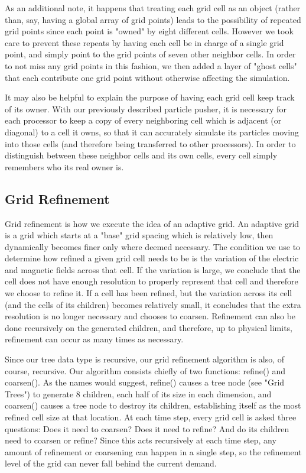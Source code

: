 \documentclass[]{article}
\begin{document}
As an additional note, it happens that treating each grid cell as an object (rather than, say, having a global array of grid points) leads to the possibility of repeated grid points since each point is "owned" by eight different cells. However we took care to prevent these repeats by having each cell be in charge of a single grid point, and simply point to the grid points of seven other neighbor cells. In order to not miss any grid points in this fashion, we then added a layer of "ghost cells" that each contribute one grid point without otherwise affecting the simulation.

It may also be helpful to explain the purpose of having each grid cell keep track of its owner. With our previously described particle pusher, it is necessary for each processor to keep a copy of every neighboring cell which is adjacent (or diagonal) to a cell it owns, so that it can accurately simulate its particles moving into those cells (and therefore being transferred to other processors). In order to distinguish between these neighbor cells and its own cells, every cell simply remembers who its real owner is.

\subsection{Grid Refinement}
Grid refinement is how we execute the idea of an adaptive grid. An adaptive grid is a grid which starts at a "base" grid spacing which is relatively low, then dynamically becomes finer only where deemed necessary. The condition we use to determine how refined a given grid cell needs to be is the variation of the electric and magnetic fields across that cell. If the variation is large, we conclude that the cell does not have enough resolution to properly represent that cell and therefore we choose to refine it. If a cell has been refined, but the variation across its cell (and the cells of its children) becomes relatively small, it concludes that the extra resolution is no longer necessary and chooses to coarsen. Refinement can also be done recursively on the generated children, and therefore, up to physical limits, refinement can occur as many times as necessary.

Since our tree data type is recursive, our grid refinement algorithm is also, of course, recursive. Our algorithm consists chiefly of two functions: refine() and coarsen(). As the names would suggest, refine() causes a tree node (see "Grid Trees") to generate 8 children, each half of its size in each dimension, and coarsen() causes a tree node to destroy its children, establishing itself as the most refined cell size at that location. At each time step, every grid cell is asked three questions: Does it need to coarsen? Does it need to refine? And do its children need to coarsen or refine? Since this acts recursively at each time step, any amount of refinement or coarsening can happen in a single step, so the refinement level of the grid can never fall behind the current demand.
\end{document}
